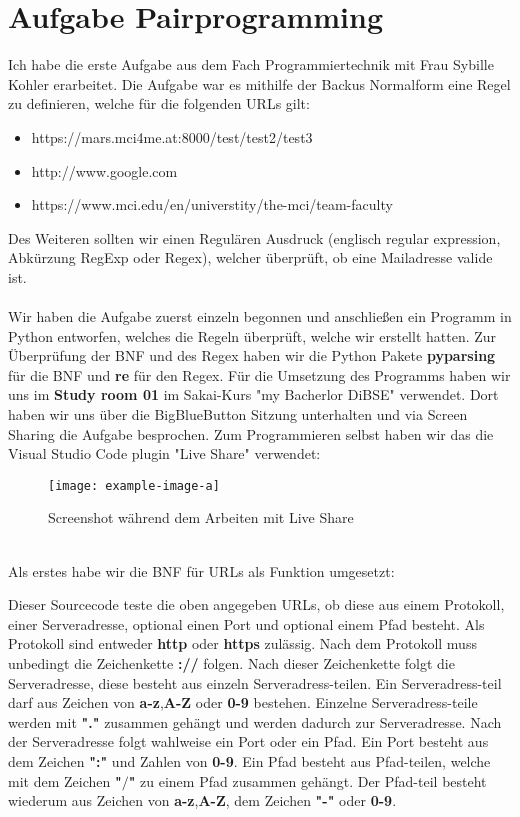 \documentclass[12pt]{article}
\begin{document}
\tableofcontents
\pagebreak
\section{Aufgabe Pairprogramming}
Ich habe die erste Aufgabe aus dem Fach Programmiertechnik mit Frau Sybille Kohler erarbeitet. Die Aufgabe war es mithilfe der Backus Normalform eine Regel zu definieren, welche für die folgenden URLs gilt:
\begin{itemize}
 \item https://mars.mci4me.at:8000/test/test2/test3
 \item http://www.google.com
 \item https://www.mci.edu/en/universtity/the-mci/team-faculty
\end{itemize}
Des Weiteren sollten wir einen Regulären Ausdruck (englisch regular expression, Abkürzung RegExp oder Regex), welcher überprüft, ob eine Mailadresse valide ist.\\\\
Wir haben die Aufgabe zuerst einzeln begonnen und anschließen ein Programm in Python entworfen, welches die Regeln überprüft, welche wir erstellt hatten. Zur Überprüfung der BNF und des Regex haben wir die Python Pakete \textbf{pyparsing} für die BNF und \textbf{re} für den Regex. Für die Umsetzung des Programms haben wir uns im \textbf{Study room 01} im Sakai-Kurs "my Bacherlor DiBSE" verwendet. Dort haben wir uns über die BigBlueButton Sitzung unterhalten und via Screen Sharing die Aufgabe besprochen. Zum Programmieren selbst haben wir das die Visual Studio Code plugin "Live Share" verwendet:
\begin{figure}[h]
 \begin{center}
  \texttt{[image: example-image-a]}
  \caption{Screenshot während dem Arbeiten mit Live Share}
 \end{center}
\end{figure}
\pagebreak\\
Als erstes habe wir die BNF für URLs als Funktion umgesetzt:

Dieser Sourcecode teste die oben angegeben URLs, ob diese aus einem Protokoll, einer Serveradresse, optional einen Port und optional einem Pfad besteht. Als Protokoll sind entweder \textbf{http} oder \textbf{https} zulässig. Nach dem Protokoll muss unbedingt die Zeichenkette \textbf{://} folgen. Nach dieser Zeichenkette folgt die Serveradresse, diese besteht aus einzeln Serveradress-teilen. Ein Serveradress-teil darf aus Zeichen von \textbf{a-z},\textbf{A-Z} oder \textbf{0-9} bestehen. Einzelne Serveradress-teile werden mit \textbf{"."} zusammen gehängt und werden dadurch zur Serveradresse. Nach der Serveradresse folgt wahlweise ein Port oder ein Pfad. Ein Port besteht aus dem Zeichen \textbf{":"} und Zahlen von \textbf{0-9}. Ein Pfad besteht aus Pfad-teilen, welche mit dem Zeichen \textbf{"$/$"} zu einem Pfad zusammen gehängt. Der Pfad-teil besteht wiederum aus Zeichen von \textbf{a-z},\textbf{A-Z}, dem Zeichen \textbf{"-"} oder \textbf{0-9}.\\\\
\end{document}
